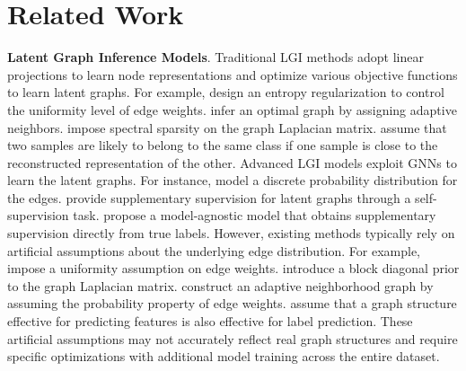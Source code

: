 \section{Related Work}
\textbf{Latent Graph Inference Models}. 
Traditional LGI methods adopt linear projections to learn node representations and optimize various objective functions to learn latent graphs.
For example, \cite{zhang2010graph} design an entropy regularization to control the uniformity level of edge weights. \cite{nie2016unsupervised} infer an optimal graph by assigning adaptive neighbors. \cite{lu2018subspace} impose spectral sparsity on the graph Laplacian matrix.
\cite{lu2021target} assume that two samples are likely to belong to the same class if one sample is close to the reconstructed representation of the other.  
Advanced LGI models exploit GNNs to learn the latent graphs. 
For instance, \cite{LDS} model a discrete probability distribution for the edges. 
\cite{SLAPS} provide supplementary supervision for latent graphs through a self-supervision task. 
\cite{jianglin2023LGI} propose a model-agnostic model that obtains supplementary supervision directly from true labels.
However, existing methods typically rely on artificial assumptions about the underlying edge distribution.
For example, \cite{zhang2010graph} impose a uniformity assumption on edge weights.
\cite{lu2018subspace} introduce a block diagonal prior to the graph Laplacian matrix.
\cite{LU2021107758} construct an adaptive neighborhood graph by assuming the probability property of edge weights.
\cite{SLAPS} assume that a graph structure effective for predicting features is also effective for label prediction.
{These artificial assumptions may not accurately reflect real graph structures and require specific optimizations with additional model training across the entire dataset.} 







 

